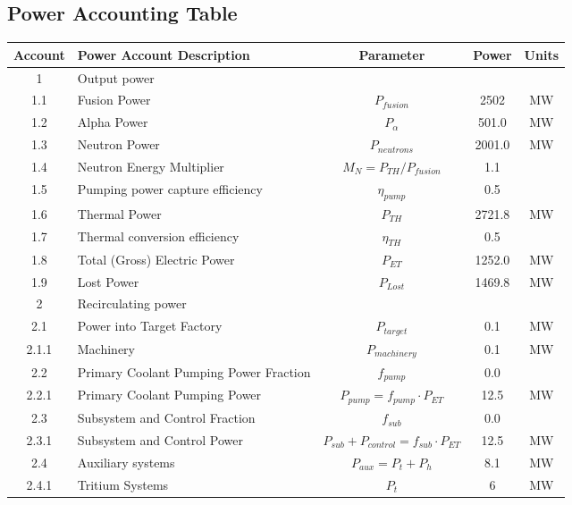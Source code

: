 \newpage
\subsection{Power Accounting Table}

\begin{table}[ht!]								
\centering								
\begin{tabular}{|c|p{5cm}|c|c|c|}								
\hline								
\textbf{Account}	&	\textbf{Power Account Description}	&	\textbf{Parameter }	&	\textbf{Power}	&	\textbf{Units} \\
\hline								
1	&	Output power	&		&		&	\\
\hline
1.1	&	Fusion Power	&	$P_{{fusion}}$	&	2502	&	MW \\
1.2	&	Alpha Power	&	$P_{{\alpha}}$	&	501.0	&	MW \\
1.3	&	Neutron Power	&	$P_{{neutrons}}$	&	2001.0	&	MW \\
1.4	&	Neutron Energy Multiplier	&	$M_N = P_{{TH}}/P_{{fusion}}$	&	1.1	&	\\
1.5	&	Pumping power capture efficiency	&	$\eta_{{pump}}$	&	0.5	&	\\
1.6	&	Thermal Power	&	$P_{{TH}}$	&	2721.8	&	MW \\
1.7	&	Thermal conversion efficiency	&	$\eta_{{TH}}$	&	0.5	&	\\
1.8	&	Total (Gross) Electric Power	&	$P_{{ET}}$	&	1252.0	&	MW \\
1.9	&	Lost Power	&	$P_{{Lost}}$	&	1469.8	&	MW \\
\hline								
2	&	Recirculating power	&		&		&	\\
\hline
2.1	&	Power into Target Factory 	&	$P_{target}$ &	0.1	&	MW \\
2.1.1	&	Machinery	&	$P_{machinery}$	&	0.1	&	MW \\
2.2	&	Primary Coolant Pumping Power Fraction	&	$f_{{pump}}$	&	0.0 &	\\
2.2.1	&	Primary Coolant Pumping Power	&	$P_{{pump}} = f_{{pump}} \cdot P_{{ET}}$	&	12.5	&	MW \\
2.3	&	Subsystem and Control Fraction	&	$f_{{sub}}$	&	0.0	&	\\
2.3.1	&	Subsystem and Control Power	&	$P_{{sub}} + P_{{control}} = f_{{sub}} \cdot P_{{ET}}$	&	12.5	&	MW \\
2.4	&	Auxiliary systems	&	$P_{{aux}} = P_{{t}} + P_{{h}}$	&	8.1	&	MW \\
2.4.1	&	Tritium Systems	&	$P_{{t}}$	&	6	&	MW \\

\end{tabular}
\end{table}
